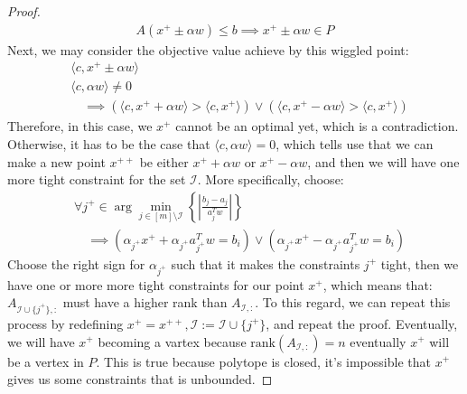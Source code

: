\documentclass[]{article}
\theoremstyle{definition}
\begin{document}
\begin{proof}
\begin{align}
            A(x^+ \pm \alpha w)  \le b
            \implies x^+ \pm \alpha w \in P
        \end{align}
        Next, we may consider the objective value achieve by this wiggled point: 
        \begin{align}
            &\langle c, x^+ \pm \alpha w\rangle
            \\
            & \langle c,\alpha w\rangle \neq 0 
            \\&\quad \implies
            (\langle c, x^+ + \alpha w\rangle > \langle c, x^+\rangle)
            \vee 
            (\langle c, x^+  -\alpha w\rangle > \langle c, x^+\rangle)
        \end{align}
        Therefore, in this case, we $x^+$ cannot be an optimal yet, which is a contradiction. Otherwise, it has to be the case that $\langle c, \alpha w\rangle = 0$, which tells use that we can make a new point $x^{++}$ be either $x^+ + \alpha w$ or $x^+ - \alpha w$, and then we will have one more tight constraint for the set $\mathcal I$. More specifically, choose: 
        \begin{align}
            & \forall j^+\in \arg\min_{j \in [m]\setminus \mathcal I}
            \left\lbrace
                \left|\frac{b_j - a_j}{a^T_jw}\right|
            \right\rbrace
            \\& \quad \implies
            (\alpha_{j^+} x^+ + \alpha_{j^+}a^T_{j^+}w = b_i )
            \vee 
            (\alpha_{j^+} x^+ - \alpha_{j^+}a^T_{j^+}w = b_i )
        \end{align}
        Choose the right sign for $\alpha_{j^+}$ such that it makes the constraints $j^+$ tight, then we have one or more more tight constraints for our point $x^+$, which means that: $A_{\mathcal I \cup \{j^+\}, :}$ must have a higher rank than $A_{\mathcal I, :}$. To this regard, we can repeat this process by redefining $x^+ = x^{++}, \mathcal I := \mathcal I \cup \{j^+\}$, and repeat the proof. Eventually, we will have $x^+$ becoming a vartex because $\text{rank}(A_{\mathcal I, :}) = n$ eventually $x^+$ will be a vertex in $P$. This is true because polytope is closed, it's impossible that $x^+$ gives us some constraints that is unbounded. 

    \end{proof}
\end{document}
